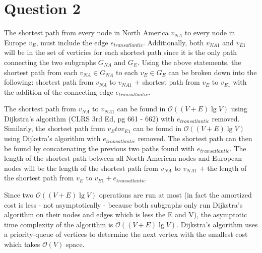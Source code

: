 \section{Question 2}
The shortest path from every node in North America $v_{NA}$ to every node in Europe $v_E$, must include the edge $e_{transatlantic}$.
Additionally, both $v_{NA1}$ and $v_{E1}$ will be in the set of verticies for each shortest path since it is the only path connecting the two subgraphs $G_{NA}$ and $G_{E}$.
\linebreak
Using the above statements, the shortest path from each $v_{NA} \in G_{NA}$ to each $v_E \in G_E$ can be broken down into the following:
shortest path from $v_{NA}$ to $v_{NA1}$ $+$ shortest path from $v_E$ to $v_{E1}$ with the addition of the connecting edge $e_{transatlantic}$.
\linebreak

The shortest path from $v_{NA}$ to $v_{NA1}$ can be found in $\mathcal{O}((V + E)\lg{V})$ using Dijkstra's algorithm (CLRS 3rd Ed, pg 661 - 662) with $e_{transatlantic}$ removed.
Similarly, the shortest path from $v_{E} to v_{E1}$ can be found in $\mathcal{O}((V + E)\lg{V})$ using Dijkstra's algorithm with $e_{transatlantic}$ removed.
The shortest path can then be found by concatenating the previous two paths found with $e_{transatlantic}$.
The length of the shortest path between all North American nodes and European nodes will be
the length of the shortest path from $v_{NA}$ to $v_{NA1}$ $+$ the length of the shortest path from $v_E$ to $v_{E1} + e_{transatlantic}$

Since two $\mathcal{O}((V + E)\lg{V})$ operations are run at most (in fact the amortized cost is less - not asymptotically - because 
both subgraphs only run Dijkstra's algorithm on their nodes and edges which is less the E and V), the asymptotic time complexity of the algorithm is $\mathcal{O}((V + E)\lg{V})$.
Dijkstra's algorithm uses a priority-queue of vertices to determine the next vertex with the smallest cost which takes $\mathcal{O}(V)$ space.